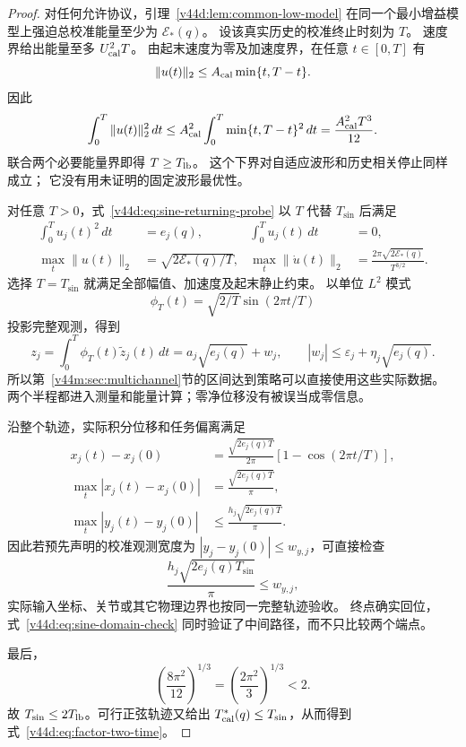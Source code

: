 \documentclass[11pt,a4paper]{article}
\numberwithin{equation}{section}
\theoremstyle{definition}
\begin{document}
\begin{proof}
对任何允许协议，引理~\ref{v44d:lem:common-low-model}
在同一个最小增益模型上强迫总校准能量至少为 $\mathcal E_*(q)$。
设该真实历史的校准终止时刻为 $T$。
速度界给出能量至多 $U_{\rm cal}^2T$。
由起末速度为零及加速度界，在任意 $t\in[0,T]$ 有
\[
 \|u(t)\|_2\le A_{\rm cal}\min\{t,T-t\}.
\]
因此
\begin{equation}
 \int_0^T\|u(t)\|_2^2\,dt
 \le A_{\rm cal}^2\int_0^T\min\{t,T-t\}^2\,dt
 =\frac{A_{\rm cal}^2T^3}{12}.
 \label{v44d:eq:acceleration-energy-bound}
\end{equation}
联合两个必要能量界即得 $T\ge T_{\rm lb}$。
这个下界对自适应波形和历史相关停止同样成立；
它没有用未证明的固定波形最优性。

对任意 $T>0$，式~\eqref{v44d:eq:sine-returning-probe}
以 $T$ 代替 $T_{\sin}$ 后满足
\begin{align}
 \int_0^T u_j(t)^2\,dt&=e_j(q),&
 \int_0^T u_j(t)\,dt&=0,\\
 \max_t\|u(t)\|_2&=\sqrt{2\mathcal E_*(q)/T},&
 \max_t\|\dot u(t)\|_2
 &=\frac{2\pi\sqrt{2\mathcal E_*(q)}}{T^{3/2}}.
 \label{v44d:eq:sine-resource-check}
\end{align}
选择 $T=T_{\sin}$ 就满足全部幅值、加速度及起末静止约束。
以单位 $L^2$ 模式
\[
 \phi_T(t)=\sqrt{2/T}\sin(2\pi t/T)
\]
投影完整观测，得到
\[
 z_j=\int_0^T\phi_T(t)\widetilde z_j(t)\,dt
     =a_j\sqrt{e_j(q)}+w_j,\qquad
 |w_j|\le\varepsilon_j+\eta_j\sqrt{e_j(q)}.
\]
所以第~\ref{v44m:sec:multichannel}节的区间达到策略可以直接使用这些实际数据。
两个半程都进入测量和能量计算；零净位移没有被误当成零信息。

沿整个轨迹，实际积分位移和任务偏离满足
\begin{align}
 x_j(t)-x_j(0)
 &=\frac{\sqrt{2e_j(q)T}}{2\pi}
    \left[1-\cos(2\pi t/T)\right],\\
 \max_t|x_j(t)-x_j(0)|
 &=\frac{\sqrt{2e_j(q)T}}{\pi},\\
 \max_t|y_j(t)-y_j(0)|
 &\le\frac{h_j\sqrt{2e_j(q)T}}{\pi}.
 \label{v44d:eq:sine-domain-check}
\end{align}
因此若预先声明的校准观测宽度为
$|y_j-y_j(0)|\le w_{y,j}$，可直接检查
\begin{equation}
 \frac{h_j\sqrt{2e_j(q)T_{\sin}}}{\pi}\le w_{y,j},
 \label{v44d:eq:sine-sound-window}
\end{equation}
实际输入坐标、关节或其它物理边界也按同一完整轨迹验收。
终点确实回位，式~\eqref{v44d:eq:sine-domain-check}
同时验证了中间路径，而不只比较两个端点。

最后，
\[
 \left(\frac{8\pi^2}{12}\right)^{1/3}
 =\left(\frac{2\pi^2}{3}\right)^{1/3}<2.
\]
故 $T_{\sin}\le2T_{\rm lb}$。可行正弦轨迹又给出
$T_{\rm cal}^*(q)\le T_{\sin}$，从而得到
式~\eqref{v44d:eq:factor-two-time}。
\end{proof}
\end{document}
